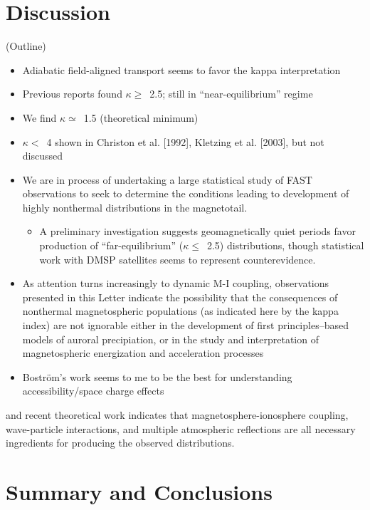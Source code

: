 


  \section{Discussion}
(Outline)

\begin{itemize}
\item Adiabatic field-aligned transport seems to favor the kappa interpretation
\item Previous reports \citep{Olsson1998,Ogasawara2006,Kaeppler2014a}
  found $\kappa \geq$~2.5; still in ``near-equilibrium'' regime
\item We find $\kappa \simeq$~1.5 (theoretical minimum)
\item $\kappa <$~4 shown in Christon et al. [1992], Kletzing et
  al. [2003], but not discussed
\item We are in process of undertaking a large statistical study of
  FAST observations to seek to determine the conditions leading to
  development of highly nonthermal distributions in the magnetotail.
  \begin{itemize}
  \item A preliminary investigation suggests geomagnetically quiet
    periods favor production of ``far-equilibrium'' ($\kappa
    \leq$~2.5) distributions, though statistical work with DMSP
    satellites \citep[e.g., Figure~7 in][]{McIntosh2014} seems to
    represent counterevidence.
  \end{itemize}
\item As attention turns increasingly to dynamic M-I coupling,
  observations presented in this Letter indicate the possibility that
  the consequences of nonthermal magnetospheric populations (as
  indicated here by the kappa index) are not ignorable either in the
  development of first principles--based models of auroral
  precipiation, or in the study and interpretation of magnetospheric
  energization and acceleration processes
\item Bostr\"{o}m's work seems to me to be the best for understanding
  accessibility/space charge effects
\end{itemize}

and recent theoretical work \citep{Khazanov2015,Khazanov2016}
indicates that magnetosphere-ionosphere coupling, wave-particle
interactions, and multiple atmospheric reflections are all necessary
ingredients for producing the observed distributions. 
  

  \section*{Summary and Conclusions}




